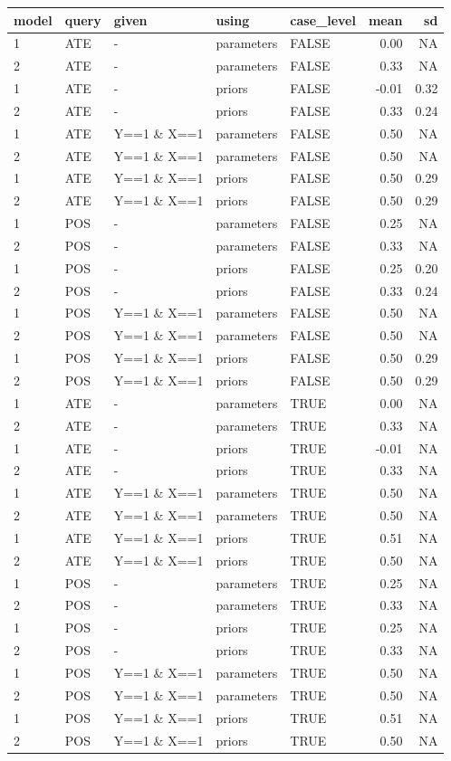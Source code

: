 \documentclass[
  article]{jss}
\begin{document}
\begin{longtable}[]{@{}lllllrr@{}}
\toprule()
model & query & given & using & case\_level & mean & sd \\
\midrule()
\endhead
1 & ATE & - & parameters & FALSE & 0.00 & NA \\
2 & ATE & - & parameters & FALSE & 0.33 & NA \\
1 & ATE & - & priors & FALSE & -0.01 & 0.32 \\
2 & ATE & - & priors & FALSE & 0.33 & 0.24 \\
1 & ATE & Y==1 \& X==1 & parameters & FALSE & 0.50 & NA \\
2 & ATE & Y==1 \& X==1 & parameters & FALSE & 0.50 & NA \\
1 & ATE & Y==1 \& X==1 & priors & FALSE & 0.50 & 0.29 \\
2 & ATE & Y==1 \& X==1 & priors & FALSE & 0.50 & 0.29 \\
1 & POS & - & parameters & FALSE & 0.25 & NA \\
2 & POS & - & parameters & FALSE & 0.33 & NA \\
1 & POS & - & priors & FALSE & 0.25 & 0.20 \\
2 & POS & - & priors & FALSE & 0.33 & 0.24 \\
1 & POS & Y==1 \& X==1 & parameters & FALSE & 0.50 & NA \\
2 & POS & Y==1 \& X==1 & parameters & FALSE & 0.50 & NA \\
1 & POS & Y==1 \& X==1 & priors & FALSE & 0.50 & 0.29 \\
2 & POS & Y==1 \& X==1 & priors & FALSE & 0.50 & 0.29 \\
1 & ATE & - & parameters & TRUE & 0.00 & NA \\
2 & ATE & - & parameters & TRUE & 0.33 & NA \\
1 & ATE & - & priors & TRUE & -0.01 & NA \\
2 & ATE & - & priors & TRUE & 0.33 & NA \\
1 & ATE & Y==1 \& X==1 & parameters & TRUE & 0.50 & NA \\
2 & ATE & Y==1 \& X==1 & parameters & TRUE & 0.50 & NA \\
1 & ATE & Y==1 \& X==1 & priors & TRUE & 0.51 & NA \\
2 & ATE & Y==1 \& X==1 & priors & TRUE & 0.50 & NA \\
1 & POS & - & parameters & TRUE & 0.25 & NA \\
2 & POS & - & parameters & TRUE & 0.33 & NA \\
1 & POS & - & priors & TRUE & 0.25 & NA \\
2 & POS & - & priors & TRUE & 0.33 & NA \\
1 & POS & Y==1 \& X==1 & parameters & TRUE & 0.50 & NA \\
2 & POS & Y==1 \& X==1 & parameters & TRUE & 0.50 & NA \\
1 & POS & Y==1 \& X==1 & priors & TRUE & 0.51 & NA \\
2 & POS & Y==1 \& X==1 & priors & TRUE & 0.50 & NA \\
\bottomrule()
\end{longtable}
\end{document}
